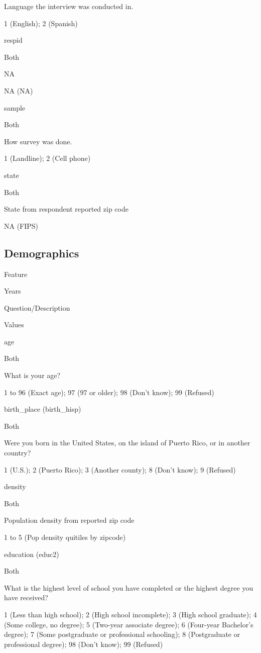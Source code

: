 \documentclass[]{book}
\begin{document}
Language the interview was conducted in.

1 (English); 2 (Spanish)

respid

Both

NA

NA (NA)

sample

Both

How survey was done.

1 (Landline); 2 (Cell phone)

state

Both

State from respondent reported zip code

NA (FIPS)

\subsection*{Demographics}\label{demographics}

Feature

Years

Question/Description

Values

age

Both

What is your age?

1 to 96 (Exact age); 97 (97 or older); 98 (Don't know); 99 (Refused)

birth\_place (birth\_hisp)

Both

Were you born in the United States, on the island of Puerto Rico, or in
another country?

1 (U.S.); 2 (Puerto Rico); 3 (Another county); 8 (Don't know); 9
(Refused)

density

Both

Population density from reported zip code

1 to 5 (Pop density quitiles by zipcode)

education (educ2)

Both

What is the highest level of school you have completed or the highest
degree you have received?

1 (Less than high school); 2 (High school incomplete); 3 (High school
graduate); 4 (Some college, no degree); 5 (Two-year associate degree); 6
(Four-year Bachelor's degree); 7 (Some postgraduate or professional
schooling); 8 (Postgraduate or professional degree); 98 (Don't know); 99
(Refused)
\end{document}
